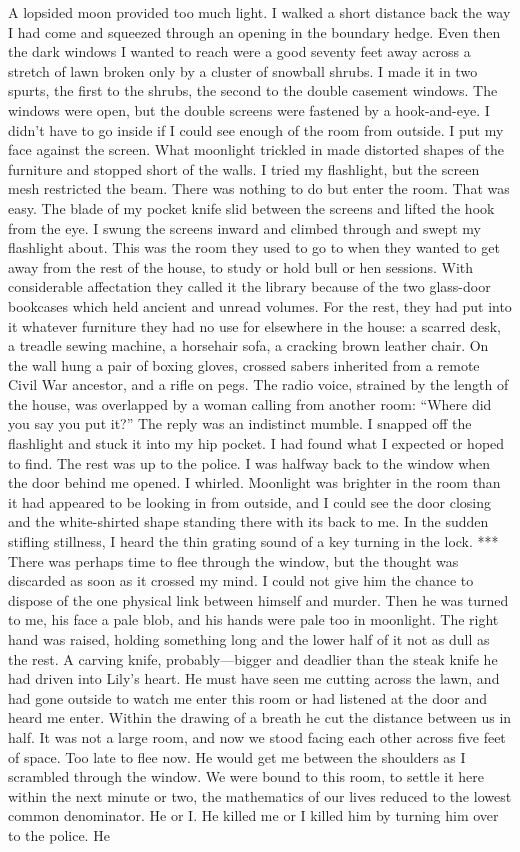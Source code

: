 \documentclass{novel}
\begin{document}
A lopsided moon provided too much light. I walked a short distance back the way I had come and squeezed through an opening in the boundary hedge. Even then the dark windows I wanted to reach were a good seventy feet away across a stretch of lawn broken only by a cluster of snowball shrubs. I made it in two spurts, the first to the shrubs, the second to the double casement windows. The windows were open, but the double screens were fastened by a hook-and-eye. I didn’t have to go inside if I could see enough of the room from outside. I put my face against the screen. What moonlight trickled in made distorted shapes of the furniture and stopped short of the walls. I tried my flashlight, but the screen mesh restricted the beam. There was nothing to do but enter the room. That was easy. The blade of my pocket knife slid between the screens and lifted the hook from the eye. I swung the screens inward and climbed through and swept my flashlight about. This was the room they used to go to when they wanted to get away from the rest of the house, to study or hold bull or hen sessions. With considerable affectation they called it the library because of the two glass-door bookcases which held ancient and unread volumes. For the rest, they had put into it whatever furniture they had no use for elsewhere in the house: a scarred desk, a treadle sewing machine, a horsehair sofa, a cracking brown leather chair. On the wall hung a pair of boxing gloves, crossed sabers inherited from a remote Civil War ancestor, and a rifle on pegs. The radio voice, strained by the length of the house, was overlapped by a woman calling from another room: “Where did you say you put it?” The reply was an indistinct mumble. I snapped off the flashlight and stuck it into my hip pocket. I had found what I expected or hoped to find. The rest was up to the police. I was halfway back to the window when the door behind me opened. I whirled. Moonlight was brighter in the room than it had appeared to be looking in from outside, and I could see the door closing and the white-shirted shape standing there with its back to me. In the sudden stifling stillness, I heard the thin grating sound of a key turning in the lock. *** There was perhaps time to flee through the window, but the thought was discarded as soon as it crossed my mind. I could not give him the chance to dispose of the one physical link between himself and murder. Then he was turned to me, his face a pale blob, and his hands were pale too in moonlight. The right hand was raised, holding something long and the lower half of it not as dull as the rest. A carving knife, probably—bigger and deadlier than the steak knife he had driven into Lily’s heart. He must have seen me cutting across the lawn, and had gone outside to watch me enter this room or had listened at the door and heard me enter. Within the drawing of a breath he cut the distance between us in half. It was not a large room, and now we stood facing each other across five feet of space. Too late to flee now. He would get me between the shoulders as I scrambled through the window. We were bound to this room, to settle it here within the next minute or two, the mathematics of our lives reduced to the lowest common denominator. He or I. He killed me or I killed him by turning him over to the police. He 
\end{document}
